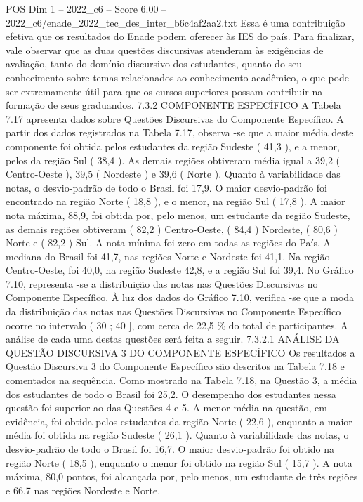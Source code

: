 \begin{textsample}{POS Dim 1 – 2022\_c6 – Score 6.00 – 2022\_c6/enade\_2022\_tec\_des\_inter\_b6c4af2aa2.txt}
Essa é uma contribuição efetiva que os resultados do Enade podem oferecer às IES do país.
Para finalizar, vale observar que as duas questões discursivas atenderam às exigências de avaliação, tanto do domínio discursivo dos estudantes, quanto do seu conhecimento sobre temas relacionados ao conhecimento acadêmico, o que pode ser extremamente útil para que os cursos superiores possam contribuir na formação de seus graduandos. 7.3.2 COMPONENTE ESPECÍFICO A Tabela 7.17 apresenta dados sobre Questões Discursivas do Componente Específico.
A partir dos dados registrados na Tabela 7.17, observa -se que a maior média deste componente foi obtida pelos estudantes da região Sudeste ( 41,3 ), e a menor, pelos da região Sul ( 38,4 ).
As demais regiões obtiveram média igual a 39,2 ( Centro-Oeste ), 39,5 ( Nordeste ) e 39,6 ( Norte ).
Quanto à variabilidade das notas, o desvio-padrão de todo o Brasil foi 17,9.
O maior desvio-padrão foi encontrado na região Norte ( 18,8 ), e o menor, na região Sul ( 17,8 ).
A maior nota máxima, 88,9, foi obtida por, pelo menos, um estudante da região Sudeste, as demais regiões obtiveram ( 82,2 ) Centro-Oeste, ( 84,4 ) Nordeste, ( 80,6 ) Norte e ( 82,2 ) Sul.
A nota mínima foi zero em todas as regiões do País.
A mediana do Brasil foi 41,7, nas regiões Norte e Nordeste foi 41,1.
Na região Centro-Oeste, foi 40,0, na região Sudeste 42,8, e a região Sul foi 39,4.
No Gráfico 7.10, representa -se a distribuição das notas nas Questões Discursivas no Componente Específico.
À luz dos dados do Gráfico 7.10, verifica -se que a moda da distribuição das notas nas Questões Discursivas no Componente Específico ocorre no intervalo ( 30 ; 40 ], com cerca de 22,5 \% do total de participantes.
A análise de cada uma destas questões será feita a seguir. 7.3.2.1 ANÁLISE DA QUESTÃO DISCURSIVA 3 DO COMPONENTE ESPECÍFICO Os resultados a Questão Discursiva 3 do Componente Específico são descritos na Tabela 7.18 e comentados na sequência.
Como mostrado na Tabela 7.18, na Questão 3, a média dos estudantes de todo o Brasil foi 25,2.
O desempenho dos estudantes nessa questão foi superior ao das Questões 4 e 5.
A menor média na questão, em evidência, foi obtida pelos estudantes da região Norte ( 22,6 ), enquanto a maior média foi obtida na região Sudeste ( 26,1 ).
Quanto à variabilidade das notas, o desvio-padrão de todo o Brasil foi 16,7.
O maior desvio-padrão foi obtido na região Norte ( 18,5 ), enquanto o menor foi obtido na região Sul ( 15,7 ).
A nota máxima, 80,0 pontos, foi alcançada por, pelo menos, um estudante de três regiões e 66,7 nas regiões Nordeste e Norte.

\end{textsample}
